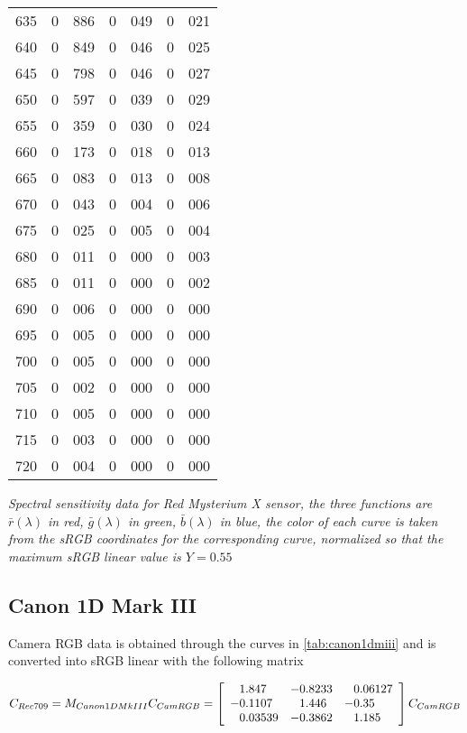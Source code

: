 {{\begin{minipage}{.3\textwidth}
\begin{tabular}{c|r@{.}l | r@{.}l | r@{.}l}
 635 &   0&886 &   0&049 &   0&021 \\
 640 &   0&849 &   0&046 &   0&025 \\
 645 &   0&798 &   0&046 &   0&027 \\
 650 &   0&597 &   0&039 &   0&029 \\
 655 &   0&359 &   0&030 &   0&024 \\
 660 &   0&173 &   0&018 &   0&013 \\
 665 &   0&083 &   0&013 &   0&008 \\
 670 &   0&043 &   0&004 &   0&006 \\
 675 &   0&025 &   0&005 &   0&004 \\
 680 &   0&011 &   0&000 &   0&003 \\
 685 &   0&011 &   0&000 &   0&002 \\
 690 &   0&006 &   0&000 &   0&000 \\
 695 &   0&005 &   0&000 &   0&000 \\
 700 &   0&005 &   0&000 &   0&000 \\
 705 &   0&002 &   0&000 &   0&000 \\
 710 &   0&005 &   0&000 &   0&000 \\
 715 &   0&003 &   0&000 &   0&000 \\
 720 &   0&004 &   0&000 &   0&000 \\
\end{tabular}
\end{minipage}

\vskip 1mm
}
\centering
{\footnotesize\it Spectral sensitivity data for Red Mysterium X sensor, the
three functions
are $\bar r(\lambda)$ in red, $\bar g(\lambda)$ in green, $\bar b(\lambda)$ in blue,
the color of each curve is taken from the \gls{sRGB} coordinates for the
corresponding
curve, normalized so that the maximum \gls{sRGB} linear value is $Y = 0.55$
}
\label{tab:redmysteriumx}
}

\newpage

\subsection{Canon 1D Mark III}

Camera \gls{RGB} data is obtained through the curves in
\cref{tab:canon1dmiii} and is converted into
\gls{sRGB} linear with the following matrix

\begin{displaymath}
C_{Rec709} = M_{Canon1DMkIII} C_{CamRGB} = \left[\begin{array}{r@{.}lr@{.}lr@{.}l}
 1&847   & -0&8233 &  0&06127  \\
-0&1107  &  1&446  & -0&35 \\
 0&03539 & -0&3862 &  1&185  \\
\end{array}\right] C_{CamRGB}
\end{displaymath}

